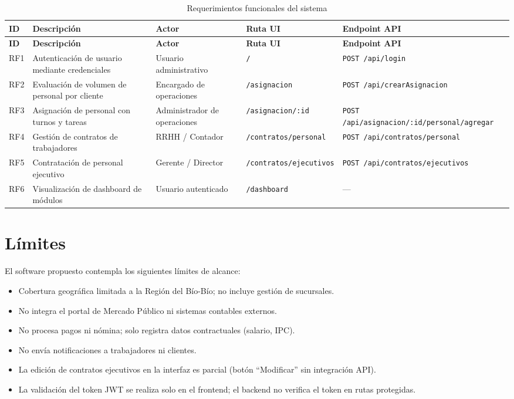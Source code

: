 \documentclass[12pt,a4paper]{report}
\begin{document}
\begin{longtable}{@{}p{0.9cm}p{3.9cm}p{2.3cm}p{2.8cm}p{3.8cm}@{}}
  \caption{Requerimientos funcionales del sistema} \label{tab:rf} \\
  \toprule
  \textbf{ID} & \textbf{Descripción} & \textbf{Actor} & \textbf{Ruta UI} & \textbf{Endpoint API} \\
  \midrule
  \endfirsthead
  \toprule
  \textbf{ID} & \textbf{Descripción} & \textbf{Actor} & \textbf{Ruta UI} & \textbf{Endpoint API} \\
  \midrule
  \endhead

  \small{RF1} & Autenticación de usuario mediante credenciales & Usuario administrativo & \scriptsize\texttt{/} & \scriptsize\texttt{POST /api/login} \\
  \small{RF2} & Evaluación de volumen de personal por cliente & Encargado de operaciones & \scriptsize\texttt{/asignacion} & \scriptsize\texttt{POST /api/crearAsignacion} \\
  \small{RF3} & Asignación de personal con turnos y tareas & Administrador de operaciones & \scriptsize\texttt{/asignacion/:id} & \scriptsize\texttt{POST /api/asignacion/:id/personal/agregar} \\
  \small{RF4} & Gestión de contratos de trabajadores & RRHH / Contador & \scriptsize\texttt{/contratos/personal} & \scriptsize\texttt{POST /api/contratos/personal} \\
  \small{RF5} & Contratación de personal ejecutivo & Gerente / Director & \scriptsize\texttt{/contratos/ejecutivos} & \scriptsize\texttt{POST /api/contratos/ejecutivos} \\
  \small{RF6} & Visualización de dashboard de módulos & Usuario autenticado & \scriptsize\texttt{/dashboard} & --- \\

  \bottomrule
\end{longtable}
\section{Límites}

El software propuesto contempla los siguientes límites de alcance:

\begin{itemize}
  \item Cobertura geográfica limitada a la Región del Bío-Bío; no incluye gestión de sucursales.
  \item No integra el portal de Mercado Público ni sistemas contables externos.
  \item No procesa pagos ni nómina; solo registra datos contractuales (salario, IPC).
  \item No envía notificaciones a trabajadores ni clientes.
  \item La edición de contratos ejecutivos en la interfaz es parcial (botón ``Modificar'' sin integración API).
  \item La validación del token JWT se realiza solo en el frontend; el backend no verifica el token en rutas protegidas.
\end{itemize}
\end{document}
